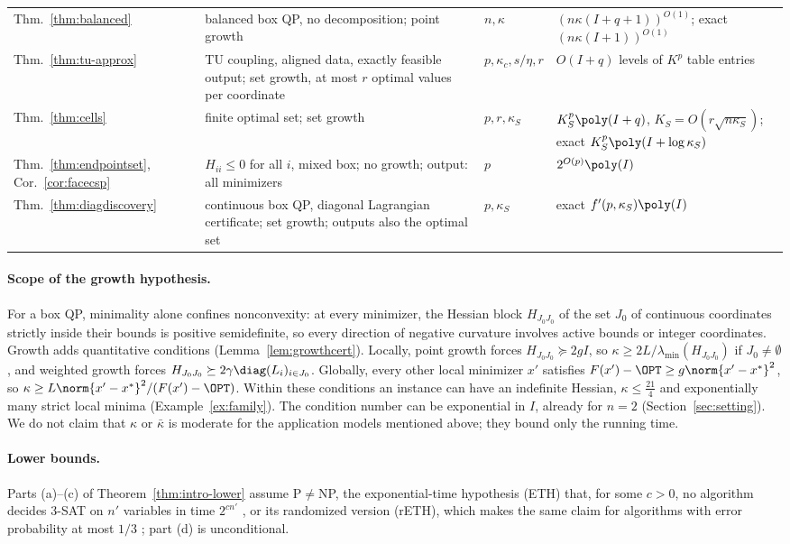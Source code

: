\begin{table}[tb]
\begin{tabular}{@{}>{\raggedright\arraybackslash}p{2.0cm}
>{\raggedright\arraybackslash}p{6.2cm}
>{\raggedright\arraybackslash}p{1.8cm}
>{\raggedright\arraybackslash}p{5.9cm}@{}}
Thm.~\ref{thm:balanced} & balanced box QP, no decomposition; point growth &
$n,\kappa$ & $(n\kappa(I+q+1))^{O(1)}$; exact $(n\kappa(I+1))^{O(1)}$\\
Thm.~\ref{thm:tu-approx} & TU coupling, aligned data, exactly feasible
output; set growth, at most $r$ optimal values per coordinate &
$p,\kappa_c,s/\eta,r$ & $O(I+q)$ levels of $K^p$ table entries\\
Thm.~\ref{thm:cells} & finite optimal set; set growth & $p,r,\kappa_S$ &
$K_S^p\poly(I+q)$, $K_S=O(r\sqrt{n\kappa_S})$; exact
$K_S^p\poly(I+\log\kappa_S)$\\
Thm.~\ref{thm:endpointset}, Cor.~\ref{cor:facecsp} & $H_{ii}\le0$ for all
$i$, mixed box; no growth; output: all minimizers & $p$ &
$2^{O(p)}\poly(I)$\\
Thm.~\ref{thm:diagdiscovery} & continuous box QP, diagonal Lagrangian
certificate; set growth; outputs also the optimal set & $p,\kappa_S$ & exact
$f'(p,\kappa_S)\poly(I)$\\
\bottomrule
\end{tabular}
\end{table}

\paragraph{Scope of the growth hypothesis.}
For a box QP, minimality alone confines nonconvexity: at every minimizer, the
Hessian block $H_{J_0J_0}$ of the set $J_0$ of continuous coordinates
strictly inside their bounds is positive semidefinite, so every direction of
negative curvature involves active bounds or integer coordinates. Growth adds
quantitative conditions (Lemma~\ref{lem:growthcert}). Locally, point growth
forces $H_{J_0J_0}\succeq2gI$, so $\kappa\ge2L/\lambda_{\min}(H_{J_0J_0})$ if
$J_0\ne\emptyset$, and weighted growth forces
$H_{J_0J_0}\succeq2\gamma\diag(L_i)_{i\in J_0}$. Globally, every other local
minimizer $x'$ satisfies $F(x')-\OPT\ge g\norm{x'-x^*}^2$, so
$\kappa\ge L\norm{x'-x^*}^2/(F(x')-\OPT)$. Within these conditions an
instance can have an indefinite Hessian, $\kappa\le\frac{21}4$ and
exponentially many strict local minima (Example~\ref{ex:family}). The
condition number can be exponential in $I$, already for $n=2$
(Section~\ref{sec:setting}). We do not claim that $\kappa$ or $\bar\kappa$
is moderate for the application models mentioned above; they bound only the
running time.

\paragraph{Lower bounds.}
Parts (a)--(c) of Theorem~\ref{thm:intro-lower} assume P${}\ne{}$NP, the
exponential-time hypothesis (ETH) that, for some $c>0$, no algorithm decides
3-SAT on $n'$ variables in time $2^{cn'}$ \cite{ImpagliazzoPaturiZane2001},
or its randomized version (rETH), which makes the same claim for algorithms
with error probability at most $1/3$ \cite{DellEtAl2014}; part (d) is
unconditional.

